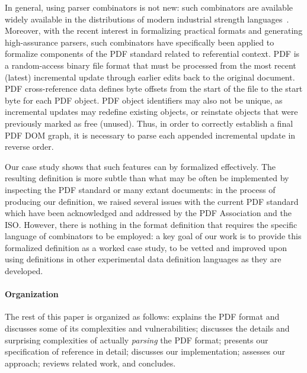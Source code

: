 In general, using parser combinators is not new: such combinators are
available widely available in the distributions of modern industrial
strength languages~\cite{leijen2001parsec,couprie2015nom,mundkurResearchReportParsley2020,bratus2017curing,willis2020staged}.
%
Moreover, with the recent interest in formalizing practical formats
and generating high-assurance parsers, such combinators have
specifically been applied to formalize components of the
PDF standard related to referential context.
%
PDF is a random-access binary file format
that must be processed from the most recent (latest) incremental
update through earlier edits back to the original document.
%
PDF cross-reference data defines byte offsets from the start of the
file to the start byte for each PDF object. PDF object identifiers may
also not be unique, as incremental updates may redefine existing
objects, or reinstate objects that were previously marked as free
(unused).
%
Thus, in order to correctly establish a final PDF DOM graph, it is
necessary to parse each appended incremental update in reverse
order.

Our case study shows that such features can by formalized effectively.
%
The resulting definition is more subtle than what may be often be
implemented by inspecting the PDF standard or many extant documents:
in the process of producing our definition, we raised several issues
with the current PDF standard which have been acknowledged and
addressed by the PDF Association and the ISO.
%
However, there is nothing in the format definition that requires the
specific language of combinators to be employed: a key goal of our work is
to provide this formalized definition as a worked case study, to be
vetted and improved upon using definitions in other experimental data
definition languages as they are developed.

\paragraph*{Organization} The rest of this paper is organized as
follows:
%
 explains the PDF format and discusses some of its
complexities and vulnerabilities;
%
 discusses the details and surprising
complexities of actually \emph{parsing} the PDF format;
%
 presents our specification of reference in detail;
%
 discusses our implementation;
%
 assesses our approach;
%
 reviews related work, and %
 concludes.

